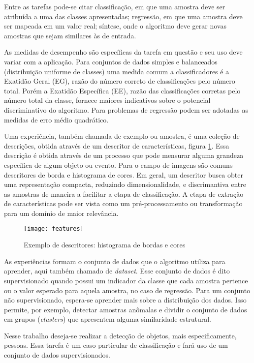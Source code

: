 Entre as tarefas pode-se citar classificação, em que uma amostra deve ser atribuída a uma das classes apresentadas; regressão, em que uma amostra deve ser mapeada em um valor real; síntese, onde o algoritmo deve gerar novas amostras que sejam similares às de entrada.

As medidas de desempenho são específicas da tarefa em questão e seu uso deve variar com a aplicação. Para conjuntos de dados simples e balanceados (distribuição uniforme de classes) uma medida comum a classificadores é a Exatidão Geral (EG), razão do número correto de classificações pelo número total. Porém a Exatidão Específica (EE), razão das classificações corretas pelo número total da classe, fornece maiores indicativos sobre o potencial discriminativo do algoritmo. Para problemas de regressão podem ser adotadas as medidas de erro médio quadrático.

Uma experiência, também chamada de exemplo ou amostra, é uma coleção de descrições, obtida através de um descritor de características, figura \ref{fig:features}. Essa descrição é obtida através de um processo que pode mensurar alguma grandeza específica de algum objeto ou evento. Para o campo de imagens são comuns descritores de borda e histograma de cores. Em geral, um descritor busca obter uma representação compacta, reduzindo dimensionalidade, e discrimantiva entre as amostras de maneira a facilitar a etapa de classificação. A etapa de extração de características pode ser vista como um pré-processamento ou transformação para um domínio de maior relevância.

\begin{figure}[h]
\centering
\texttt{[image: features]}
\caption{Exemplo de descritores: histograma de bordas e cores}
\label{fig:features}
\end{figure}

As experiências formam o conjunto de dados que o algoritmo utiliza para aprender, aqui também chamado de \textit{dataset}. Esse conjunto de dados é dito supervisionado quando possui um indicador da classe que cada amostra pertence ou o valor esperado para aquela amostra, no caso de regressão. Para um conjunto não supervisionado, espera-se aprender mais sobre a distribuição dos dados. Isso permite, por exemplo, detectar amostras anômalas e dividir o conjunto de dados em grupos (\textit{clusters}) que apresentem alguma similaridade estrutural.

Nesse trabalho deseja-se realizar a detecção de objetos, mais especificamente, pessoas. Essa tarefa é um caso particular de classificação e fará uso de um conjunto de dados supervisionados.

